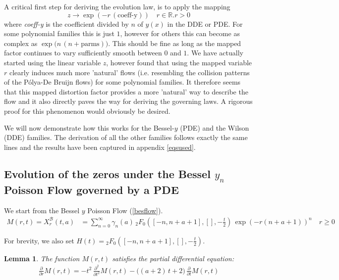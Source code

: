 \documentclass[a4paper,11pt,twoside]{amsart}
\newtheorem{lemma}[theorem]{Lemma}
\begin{document}
A critical first step for deriving the evolution law, is to apply the mapping $$z \rightarrow \exp\left(-r\,(\text{coeff-y})\right) \quad r \in \mathbb{R}. r > 0$$ where \textit{coeff-y} is the coefficient divided by $n$ of $y(x)$ in the DDE or PDE. For some polynomial families this is just $1$, however for others this can become as complex as $\exp\big(n\,(n+\text{parms})\big)$. This should be fine as long as the mapped factor continues to vary sufficiently smooth between $0$ and $1$. We have actually started using the linear variable $z$, however found that using the mapped variable $r$ clearly induces much more 'natural' flows (i.e. resembling the collision patterns of the Pólya-De Bruijn flows) for some polynomial families. It therefore seems that this mapped distortion factor provides a more 'natural' way to describe the flow and it also directly paves the way for deriving the governing laws. A rigorous proof for this phenomenon would obviously be desired.    

We will now demonstrate how this works for the Bessel-$y$ (PDE) and the Wilson (DDE) families. The derivation of all the other families follows exactly the same lines and the results have been captured in appendix \ref{eqsused}.

\subsection{Evolution of the zeros under the Bessel $y_n$ Poisson Flow governed by a PDE} \label{Bessellawspoissonflow}
We start from the Bessel $y$ Poisson Flow (\ref{besflow}).
\begin{align}
  M(r,t)=X^{\mathcal{B}}_{r}(t,a) &= \sum_{n=0}^\infty \gamma_n(a)\,{}_2F_0\left([-n, n+a+1],[],-\frac{t}{2}\right)\,\exp(-r(n+a+1))^{n} \quad r \ge 0
\end{align} 

For brevity, we also set $H(t) = {}_2F_0\left([-n, n+a+1],[],-\frac{t}{2}\right)$. 

\begin{lemma}\label{proofBes1} The function $M(r,t)$ satisfies the partial differential equation: 
\begin{align}
 \frac{\partial}{\partial r}M(r,t) = -t^2\,\frac{\partial^2}{\partial t^2}M(r,t) - \big((a+2)\,t+2\big)\,\frac{\partial }{\partial t}M(r,t)
\end{align}
\end{lemma}
\end{document}
